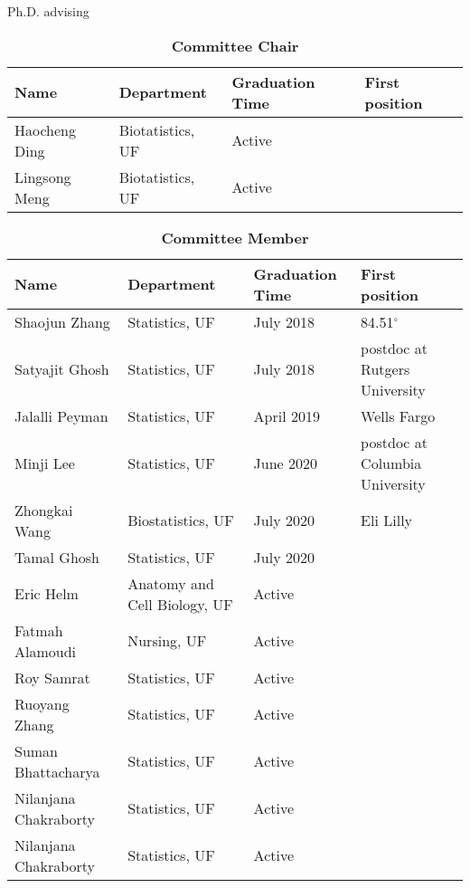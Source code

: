 \documentclass{resume} %
\begin{document}
\begin{rSection}{Ph.D. advising}

\begin{table}[htp]
\caption*{\textbf{Committee Chair}}
\begin{center}
\begin{tabular}{l l l l}
\hline
\hline
Name & Department & Graduation Time & First position \\
\hline
Haocheng Ding & Biotatistics, UF & Active &  \\
Lingsong Meng & Biotatistics, UF & Active &  \\
\hline
\hline
\end{tabular}
\end{center}
\label{default}
\end{table}%


\begin{table}[htp]
\caption*{\textbf{Committee Member}}
\begin{center}
\begin{tabular}{l l l l}
\hline
\hline
Name & Department & Graduation Time & First position \\
\hline
Shaojun Zhang & Statistics, UF & July 2018 & 84.51$^\circ$ \\
Satyajit Ghosh & Statistics, UF & July 2018 & postdoc at Rutgers University \\
Jalalli Peyman & Statistics, UF & April 2019 & Wells Fargo \\
Minji Lee & Statistics, UF & June 2020 &postdoc at Columbia University\\
Zhongkai Wang &  Biostatistics, UF & July 2020 & Eli Lilly \\
Tamal Ghosh & Statistics, UF & July 2020 & \\
Eric Helm &  Anatomy and Cell Biology, UF & Active & \\
Fatmah Alamoudi & Nursing, UF & Active & \\
Roy Samrat & Statistics, UF & Active & \\
Ruoyang Zhang & Statistics, UF & Active & \\
Suman Bhattacharya & Statistics, UF & Active & \\
Nilanjana Chakraborty & Statistics, UF & Active & \\
Nilanjana Chakraborty & Statistics, UF & Active & \\
\hline
\hline
\end{tabular}
\end{center}
\label{default}
\end{table}%

\end{rSection}
\end{document}
